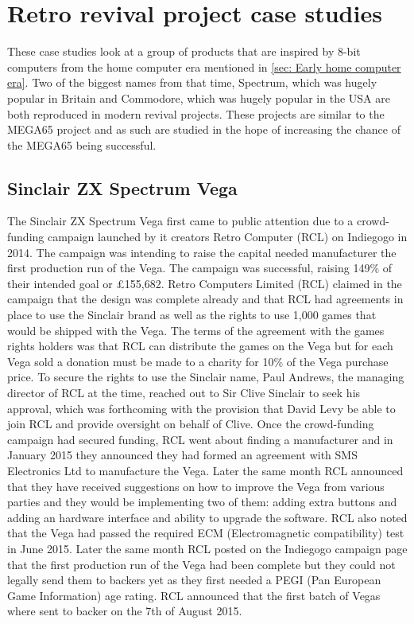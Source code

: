 \section{Retro revival project case studies}
These case studies look at a group of products that are inspired by 8-bit computers from the home computer era mentioned in \ref{sec: Early home computer era}. Two of the biggest names from that time, Spectrum, which was hugely popular in Britain and Commodore, which was hugely popular in the USA are both reproduced in modern revival projects. These projects are similar to the MEGA65 project and as such are studied in the hope of increasing the chance of the MEGA65 being successful. 

\subsection{Sinclair ZX Spectrum Vega}
\label{Vega process}
The Sinclair ZX Spectrum Vega first came to public attention due to a crowd-funding campaign launched by it creators Retro Computer (RCL) on Indiegogo in 2014. The campaign was intending to raise the capital needed manufacturer the first production run of the Vega. The campaign was successful, raising 149\% of their intended goal or \pounds 155,682. Retro Computers Limited (RCL) claimed in the campaign that the design was complete already and that RCL had agreements in place to use the Sinclair brand as well as the rights to use 1,000 games that would be shipped with the Vega. The terms of the agreement with the games rights holders was that RCL can distribute the games on the Vega but for each Vega sold a donation must be made to a charity for 10\% of the Vega purchase price. To secure the rights to use the Sinclair name, Paul Andrews, the managing director of RCL at the time, reached out to Sir Clive Sinclair to seek his approval, which was forthcoming with the provision that David Levy be able to join RCL and provide oversight on behalf of Clive. Once the crowd-funding campaign had secured funding, RCL went about finding a manufacturer and in January 2015 they announced they had formed an agreement with SMS Electronics Ltd to manufacture the Vega. Later the same month RCL announced that they have received suggestions on how to improve the Vega from various parties and they would be implementing two of them: adding extra buttons and adding an hardware interface and ability to upgrade the software. RCL also noted that the Vega had passed the required ECM (Electromagnetic compatibility) test in June 2015. Later the same month RCL posted on the Indiegogo campaign page that the first production run of the Vega had been complete but they could not legally send them to backers yet as they first needed a PEGI (Pan European Game Information) age rating. RCL announced that the first batch of Vegas where sent to backer on the 7th of August 2015.


